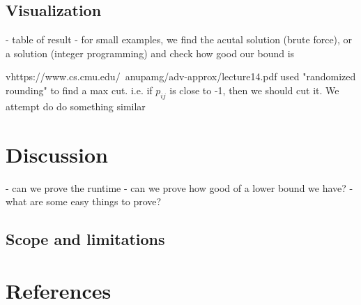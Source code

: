 \documentclass{article}
\begin{document}
\subsection{Visualization}
- table of result
- for small examples, we find the acutal solution (brute force), or a solution (integer programming) and check how 
good our bound is

vhttps://www.cs.cmu.edu/~anupamg/adv-approx/lecture14.pdf used "randomized rounding" to find a max cut.
i.e. if $p_{ij}$ is close to -1, then we should cut it. We attempt do do something similar

\section{Discussion}


- can we prove the runtime
- can we prove how good of a lower bound we have?
- what are some easy things to prove?

\subsection{Scope and limitations}

\section{References}
\end{document}
